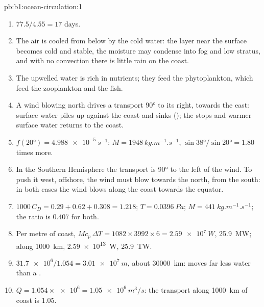 \begin{solution}{pb:b1:ocean-circulation:1}
\begin{enumerate}
  \item $77.5/4.55 = 17$ days.
  \item The air is cooled from below by the cold water: the layer near the surface
        becomes cold and stable, the moisture may condense into fog and low stratus,
        and with no convection there is little rain on the coast.
  \item The upwelled water is rich in nutrients; they feed the phytoplankton, which
        feed the zooplankton and the fish.
  \item A wind blowing north drives a transport \ang{90} to its right, towards the
        east: surface water piles up against the coast and sinks (); the
         stops and warmer surface water returns to the coast.
  \item $f(\ang{20}) = \qty{4.988e-5}{s^{-1}}$: $M = \qty{1948}{kg.m^{-1}.s^{-1}}$,
        $\sin\ang{38}/\sin\ang{20} = 1.80$ times more.
  \item In the Southern Hemisphere the transport is \ang{90} to the left of the
        wind. To push it west, offshore, the wind must blow towards the north, from
        the south: in both cases the wind blows along the coast towards the equator.
  \item $1000\,C_D = 0.29 + 0.62 + 0.308 = 1.218$; $T = \qty{0.0396}{Pa}$; $M =
        \qty{441}{kg.m^{-1}.s^{-1}}$; the ratio is $0.407$ for both.
  \item Per metre of coast, $M c_p\,\Delta T = 1082 \times 3992 \times 6 =
        \qty{2.59e7}{W}$, \qty{25.9}{MW}; along \qty{1000}{km}, \qty{2.59e13}{W},
        \qty{25.9}{TW}.
  \item $\num{31.7e6}/1.054 = \qty{3.01e7}{m}$, about \qty{30000}{km}:  moves far less water than a .
  \item $Q = 1.054 \times \num{e6} = \qty{1.05e6}{m^3/s}$: the  transport
        along \qty{1000}{km} of coast is \qty{1.05}{\sverdrup}.
\end{enumerate}
\end{solution}
